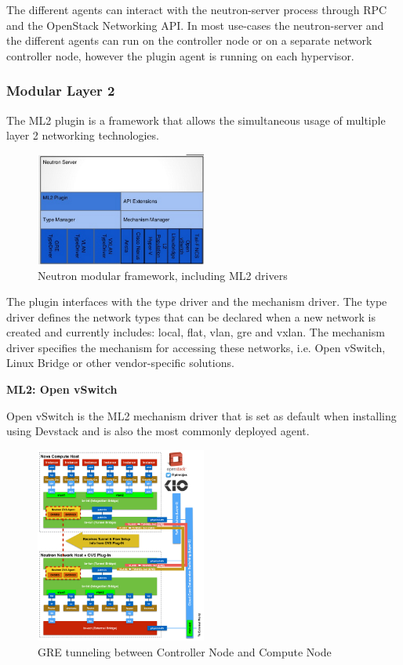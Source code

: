 The different agents can interact with the neutron-server process through RPC and the OpenStack Networking API. In most use-cases the neutron-server and the different agents can run on the controller node or on a separate network controller node, however the plugin agent is running on each hypervisor.


\subsubsection{Modular Layer 2}

The ML2 plugin is a framework that allows the simultaneous usage of multiple layer 2 networking technologies.

\begin{figure}[H]
\centering
\includegraphics[width=0.5\textwidth]{images/fundamentals/neutron_ml2.png}
\caption{Neutron modular framework, including ML2 drivers}
\end{figure}

The plugin interfaces with the type driver and the mechanism driver. The type driver defines the network types that can be declared when a new network is created and currently includes: local, flat, vlan, gre and vxlan. The mechanism driver specifies the mechanism for accessing these networks, i.e. Open vSwitch, Linux Bridge or other vendor-specific solutions. 



\textbf{ML2: Open vSwitch}

Open vSwitch is the ML2 mechanism driver that is set as default when installing using Devstack and is also the most commonly deployed agent.

\begin{figure}[H]
\centering
\includegraphics[width=0.5\textwidth]{images/fundamentals/neutron_gre_connection_nodes.jpg}
\caption{GRE tunneling between Controller Node and Compute Node}
\end{figure}

